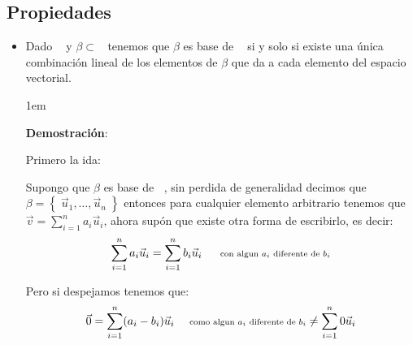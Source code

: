 \documentclass[12pt, fleqn]{report}                             %
\newenvironment{SmallIndentation}[1][0.75em]                    %
        {\begin{adjustwidth}{#1}{}\begin{footnotesize}}             %
        {\end{footnotesize}\end{adjustwidth}}                       %
\DeclareMathOperator \Space     {\quad}                         %
\newcommand \Remember[1]    {\Space\text{\scriptsize{#1}}}      %
\theoremstyle{break}                                            %
\DeclareMathOperator \GenericField {\mathbb{F}}                 %
\DeclareMathOperator \VectorSet    {\mathbb{V}}                 %
\DeclareMathOperator \VectorSpace  {\VectorSet_{\GenericField}} %
\newcommand{\Set}[1]            {\left\{ \; #1 \; \right\}}     %
\begin{document}
            \clearpage
            \subsection{Propiedades}

                \begin{itemize}
                    
                    \item 
                        Dado $\VectorSpace$ y $\beta \subset \VectorSpace$  
                        tenemos que $\beta$ es base de $\VectorSpace$ si y solo si
                        existe una única combinación lineal de los elementos de $\beta$
                        que da a cada elemento del espacio vectorial.

                        \begin{SmallIndentation}[1em]
                            \textbf{Demostración}:

                            Primero la ida:

                            Supongo que $\beta$ es base de $\VectorSpace$, sin 
                            perdida de generalidad decimos que $\beta = \Set{\vec u_1, \dots, \vec u_n}$
                            entonces para cualquier elemento arbitrario tenemos
                            que $\vec v = \sum_{i=1}^n a_i \vec u_i$, ahora supón que existe
                            otra forma de escribirlo, es decir:
                            \begin{align*}
                                \sum_{i=1}^n a_i \vec u_i = \sum_{i=1}^n b_i \vec u_i
                                    \Remember{ con algun $a_i$ diferente de $b_i$}
                            \end{align*}

                            Pero si despejamos tenemos que:
                            \begin{align*}
                                \vec  0 
                                    = \sum_{i=1}^n (a_i-b_i) \vec u_i
                                    \Remember{como algun $a_i$ diferente de $b_i$} 
                                    \neq \sum_{i=1}^n 0 \vec u_i
                            \end{align*}


\end{SmallIndentation}
\end{itemize}
\end{document}
